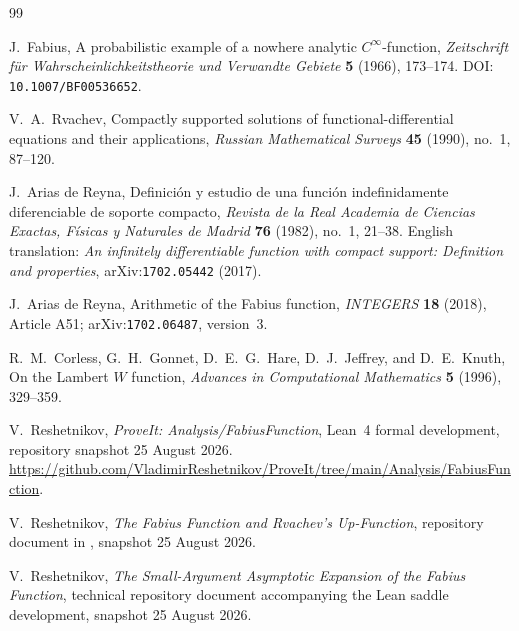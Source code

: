 \documentclass[11pt,oneside]{article}
\theoremstyle{definition}
\theoremstyle{remark}
\begin{document}
\begin{thebibliography}{99}

J.~Fabius,
\newblock A probabilistic example of a nowhere analytic $C^\infty$-function,
\newblock \emph{Zeitschrift f\"ur Wahrscheinlichkeitstheorie und Verwandte
Gebiete} \textbf{5} (1966), 173--174.
\newblock DOI: \nolinkurl{10.1007/BF00536652}.

V.~A.~Rvachev,
\newblock Compactly supported solutions of functional-differential equations
and their applications,
\newblock \emph{Russian Mathematical Surveys} \textbf{45} (1990), no.~1,
87--120.

J.~Arias de Reyna,
\newblock Definici\'on y estudio de una funci\'on indefinidamente
diferenciable de soporte compacto,
\newblock \emph{Revista de la Real Academia de Ciencias Exactas, F\'isicas y
Naturales de Madrid} \textbf{76} (1982), no.~1, 21--38.
\newblock English translation:
\emph{An infinitely differentiable function with compact support:
Definition and properties}, arXiv:\nolinkurl{1702.05442} (2017).

J.~Arias de Reyna,
\newblock Arithmetic of the Fabius function,
\newblock \emph{INTEGERS} \textbf{18} (2018), Article A51;
arXiv:\nolinkurl{1702.06487}, version~3.

R.~M.~Corless, G.~H.~Gonnet, D.~E.~G.~Hare, D.~J.~Jeffrey, and D.~E.~Knuth,
\newblock On the Lambert $W$ function,
\newblock \emph{Advances in Computational Mathematics}
\textbf{5} (1996), 329--359.

V.~Reshetnikov,
\newblock \emph{ProveIt: Analysis/FabiusFunction},
\newblock Lean~4 formal development, repository snapshot 25 August 2026.
\newblock
\url{https://github.com/VladimirReshetnikov/ProveIt/tree/main/Analysis/FabiusFunction}.

V.~Reshetnikov,
\newblock \emph{The Fabius Function and Rvachev's Up-Function},
\newblock repository document in
,
snapshot 25 August 2026.

V.~Reshetnikov,
\newblock \emph{The Small-Argument Asymptotic Expansion of the Fabius
Function},
\newblock technical repository document accompanying the Lean saddle
development, snapshot 25 August 2026.

\end{thebibliography}
\end{document}
